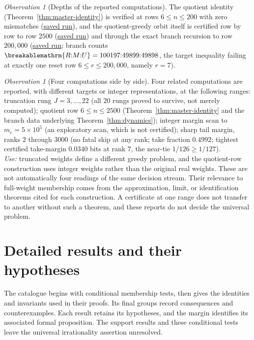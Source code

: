 \documentclass[11pt]{article}
\theoremstyle{plain}
\theoremstyle{definition}
\theoremstyle{remark}
\newtheorem{obs}[thm]{Observation}
\renewcommand{\mathrm}[1]{\ifmmode\breakablemathrm{#1}\else\textrm{#1}\fi}%
\begin{document}
\begin{obs}[Depths of the reported computations]
\label{obs:anchors-depth}
The quotient identity (Theorem~\ref{thm:master-identity}) is verified at rows $6 \le n \le 200$ with zero
mismatches
(\href{https://github.com/wcook04/plectis-erdos/blob/f757115e03bebe5c04431a147da559015c680a37/research/experiments/erdos257/receipts/quotient-identity-200.json}{saved run}),
and the quotient-greedy orbit itself is certified row by row to row $2500$
(\href{https://github.com/wcook04/plectis-erdos/blob/f757115e03bebe5c04431a147da559015c680a37/research/experiments/erdos257/receipts/seam-reset-crossing-2500.json}{saved run})
and through the exact branch recursion to row $200{,}000$
(\href{https://github.com/wcook04/plectis-erdos/blob/f757115e03bebe5c04431a147da559015c680a37/research/experiments/erdos257/receipts/seam-orbit-200000.json}{saved run}; branch counts $\mathrm{R{:}M{:}U} =
100197{:}49899{:}49898$, the target inequality failing at exactly one reset row $6\le r\le 200{,}000$,
namely $r=7$).
\end{obs}

\begin{obs}[Four computations side by side]
\label{obs:anchors-coords}
Four related computations are reported, with different targets or
integer representations, at the following ranges: truncation rung $J = 3,\dots,22$ (all $20$ rungs proved to
survive, not merely computed); quotient row $6 \le n \le 2500$
(Theorem~\ref{thm:master-identity} and the branch data underlying
Theorem~\ref{thm:dynamics}); integer margin scan to $m_c = 5\times10^5$
(an exploratory scan, which is not certified); sharp tail margin, ranks $2$ through
$3000$ (no fatal skip at any rank; take fraction $0.4992$; tightest certified take-margin
$0.0340$ bits at rank $7$, the near-tie $1/126 \ge 1/127$).\\
\textit{Use:} truncated weights define a different greedy problem,
and the quotient-row construction uses integer weights rather than the
original real weights.  These are not automatically four readings of
the same decision stream.  Their relevance to full-weight membership
comes from the approximation, limit, or identification theorems cited
for each construction.  A certificate at one range does not transfer
to another without such a theorem, and these reports do not decide the
universal problem.
\end{obs}

\section{Detailed results and their hypotheses}
The catalogue begins with conditional membership tests, then gives the
identities and invariants used in their proofs. Its final groups record
consequences and counterexamples. Each result retains its hypotheses,
and the margin identifies its associated formal proposition. The
support results and these conditional tests leave the universal
irrationality assertion unresolved.
\end{document}
